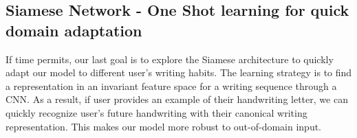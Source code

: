 \documentclass{article}
\begin{document}
\begin{multicols*}{2}
\subsection{Siamese Network - One Shot learning for quick domain adaptation}
If time permits, our last goal is to explore the Siamese architecture \cite{Schroff2015FaceNetAU} to quickly adapt our model to different user's writing habits. The learning strategy is to find a representation in an invariant feature space for a writing sequence through a CNN. As a result, if user provides an example of their handwriting letter, we can quickly recognize user's future handwriting with their canonical writing representation. This makes our model more robust to out-of-domain input.












\end{multicols*}
\end{document}
